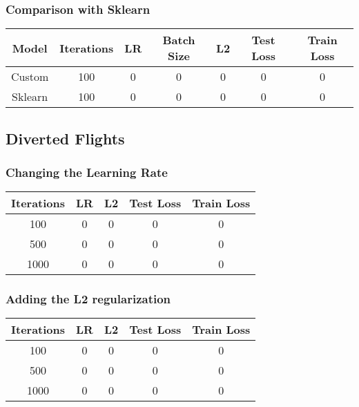 \documentclass[
	letterpaper, %
	10pt, %
]{class}
\begin{document}
\subsubsection{Comparison with Sklearn}

\begin{center}
	\begin{tabular}{ |c|c|c|c|c|c|c| }
		\hline
		Model   & Iterations & LR & Batch Size & L2 & Test Loss & Train Loss \\
		\hline
		Custom  & 100        & 0  & 0          & 0  & 0         & 0          \\
		Sklearn & 100        & 0  & 0          & 0  & 0         & 0          \\
		\hline
	\end{tabular}
\end{center}

\subsection{Diverted Flights}

\subsubsection{Changing the Learning Rate}

\begin{center}
	\begin{tabular}{ |c|c|c|c|c| }
		\hline
		Iterations & LR & L2 & Test Loss & Train Loss \\
		\hline
		100        & 0  & 0  & 0         & 0          \\
		500        & 0  & 0  & 0         & 0          \\
		1000       & 0  & 0  & 0         & 0          \\
		\hline
	\end{tabular}
\end{center}

\subsubsection{Adding the L2 regularization}

\begin{center}
	\begin{tabular}{ |c|c|c|c|c| }
		\hline
		Iterations & LR & L2 & Test Loss & Train Loss \\
		\hline
		100        & 0  & 0  & 0         & 0          \\
		500        & 0  & 0  & 0         & 0          \\
		1000       & 0  & 0  & 0         & 0          \\
		\hline
	\end{tabular}
\end{center}
\end{document}
